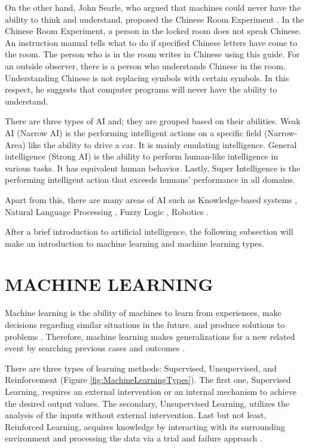 On the other hand, John Searle, who argued that machines could never have the ability to think and understand, proposed the Chinese Room Experiment \cite{preston2002views}. In the Chinese Room Experiment, a person in the locked room does not speak Chinese. An instruction manual tells what to do if specified Chinese letters have come to the room. The person who is in the room writes in Chinese using this guide. For an outside observer, there is a person who understands Chinese in the room. Understanding Chinese is not replacing symbols with certain symbols. In this respect, he suggests that computer programs will never have the ability to understand.

There are three types of AI and; they are grouped based on their abilities. Weak AI (Narrow AI) \cite{confbringsjord2003artificial} is the performing intelligent actions on a specific field (Narrow-Area) like the ability to drive a car. It is mainly emulating intelligence. General intelligence (Strong AI) \cite{confbringsjord2003artificial} is the ability to perform human-like intelligence in various tasks. It has equivalent human behavior. Lastly, Super Intelligence \cite{bostrom2003ethical} is the performing intelligent action that exceeds humans' performance in all domains.

Apart from this, there are many areas of AI such as Knowledge-based systems \cite{davis1982knowledge}, Natural Language Processing \cite{dale2000handbook}, Fuzzy Logic \cite{zadeh1996fuzzy}, Robotics \cite{brady1984artificial}. 

After a brief introduction to artificial intelligence, the following subsection will make an introduction to machine learning and machine learning types.

\section{MACHINE LEARNING}
Machine learning is the ability of machines to learn from experiences, make decisions regarding similar situations in the future, and produce solutions to problems \cite{booksmichie1994machine}. Therefore, machine learning makes generalizations for a new related event by searching previous cases and outcomes \cite{booksmichie1994machine}.

There are three types of learning methods: Supervised, Unsupervised, and Reinforcement (Figure \ref{fig:MachineLearningTypes}). The first one, Supervised Learning, requires an external intervention or an internal mechanism to achieve the desired output values. The secondary, Unsupervised Learning, utilizes  the analysis of the inputs without external intervention. Last but not least, Reinforced Learning, acquires knowledge by interacting with its surrounding environment and processing the data via a trial and failure approach \cite{sathya2013comparison}.


